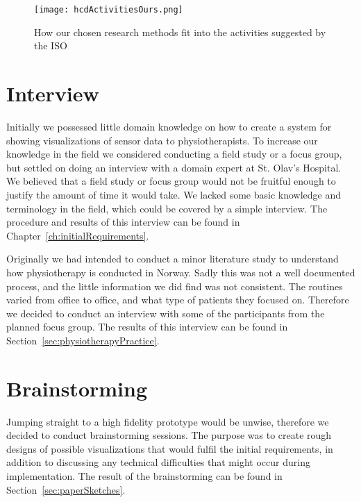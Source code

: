 \clearpage

\begin{figure}[t]
	\centering
		\texttt{[image: hcdActivitiesOurs.png]}
		\caption[Project workflow]{How our chosen research methods fit into the activities suggested by the ISO}
		\label{fig:hcdActivitiesOurs}
\end{figure}

\section{Interview}
Initially we possessed little domain knowledge on how to create a system for showing visualizations of sensor data to physiotherapists. To increase our knowledge in the field we considered conducting a field study or a focus group, but settled on doing an interview with a domain expert at St. Olav's Hospital. We believed that a field study or focus group would not be fruitful enough to justify the amount of time it would take. We lacked some basic knowledge and terminology in the field, which could be covered by a simple interview. The procedure and results of this interview can be found in Chapter~\ref{ch:initialRequirements}. 

Originally we had intended to conduct a minor literature study to understand how physiotherapy is conducted in Norway. Sadly this was not a well documented process, and the little information we did find was not consistent. The routines varied from office to office, and what type of patients they focused on. Therefore we decided to conduct an interview with some of the participants from the planned focus group. The results of this interview can be found in Section~\ref{sec:physiotherapyPractice}.
 
\section{Brainstorming}
Jumping straight to a high fidelity prototype would be unwise, therefore we decided to conduct brainstorming sessions. The purpose was to create rough designs of possible visualizations that would fulfil the initial requirements, in addition to discussing any technical difficulties that might occur during implementation. The result of the brainstorming can be found in Section~\ref{sec:paperSketches}.

